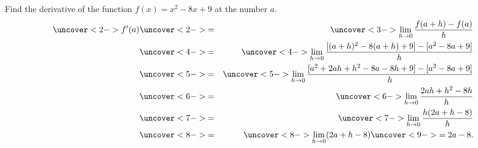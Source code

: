 \begin{frame}
\begin{example}[Example 4, p. 116]
Find the derivative of the function $f(x) = x^2 -8x + 9$ at the number $a$.
\begin{eqnarray*}
\uncover<2->{f'(a)} & \uncover<2->{=} & %
\uncover<3->{\lim_{h\rightarrow 0}\frac{f(a+h)-f(a)}{h}}\\
 & \uncover<4->{=} & %
\uncover<4->{\lim_{h\rightarrow 0}\frac{[(a+h)^2-8(a+h)+9]-[a^2-8a+9]}{h}}\\
 & \uncover<5->{=} & %
\uncover<5->{\lim_{h\rightarrow 0}\frac{[a^2 + 2ah + h^2-8a-8h+9]-[a^2-8a+9]}{h}}\\
 & \uncover<6->{=} & %
\uncover<6->{\lim_{h\rightarrow 0}\frac{2ah + h^2-8h}{h}}\\
 & \uncover<7->{=} & %
\uncover<7->{\lim_{h\rightarrow 0}\frac{h(2a + h-8)}{h}}\\
 & \uncover<8->{=} & %
\uncover<8->{\lim_{h\rightarrow 0}(2a + h-8)} \uncover<9->{ = 2a-8.}\\
\end{eqnarray*}
\end{example}
\end{frame}

